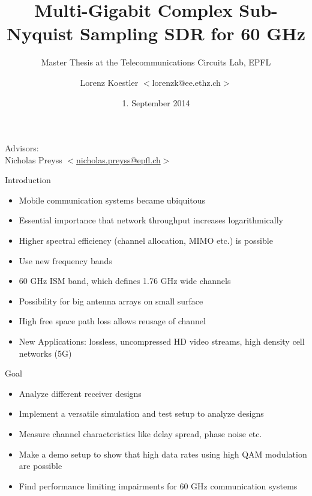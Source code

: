 \documentclass{beamer}
\title{Multi-Gigabit Complex Sub-Nyquist Sampling SDR for 60 GHz}
\subtitle{Master Thesis at the Telecommunications Circuits Lab, EPFL}
\author{Lorenz Koestler $ < $lorenzk@ee.ethz.ch$ > $}
\date[1.9..2013]{1. September 2014}
\begin{document}
\begin{frame}
  \titlepage

  Advisors: \\
  Nicholas Preyss $ < $\href{mailto:nicholas.preyss@epfl.ch}{nicholas.preyss@epfl.ch}$ > $ \\
\end{frame}

\begin{frame}{Introduction}
  \begin{itemize}
  \item Mobile communication systems became ubiquitous
  \item Essential importance that network throughput increases
    logarithmically
  \item Higher spectral efficiency (channel allocation, MIMO etc.) is possible
  \item Use new frequency bands
  \item 60 GHz ISM band, which defines 1.76 GHz wide channels
  \item Possibility for big antenna arrays on small surface
  \item High free space path loss allows reusage of channel
  \item New Applications: lossless, uncompressed HD video streams,
    high density cell networks (5G)
  \end{itemize}
\end{frame}

\begin{frame}{Goal}
  \begin{itemize}
  \item Analyze different receiver designs
  \item Implement a versatile simulation and test setup to analyze designs
  \item Measure channel characteristics like delay spread, phase noise etc.
  \item Make a demo setup to show that high data rates using high QAM modulation
    are possible
  \item Find performance limiting impairments for 60 GHz communication systems
  \end{itemize}
\end{frame}
\end{document}
